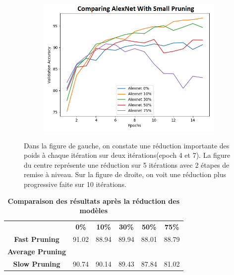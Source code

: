 \documentclass[12pt]{article}
\begin{document}
\begin{figure}[H]
\begin{subfigure}[b]{0.33\textwidth}
		\label{fig:pruneratioslow}
	\end{subfigure}
	\begin{subfigure}[b]{0.33\textwidth}
		\centering
		\includegraphics[width=\textwidth]{prune_ratio_slow}
		\label{fig:pruneratioslow}
	\end{subfigure}
	\caption{Dans la figure de gauche, on constate une réduction importante des poids à chaque itération sur deux itérations(epoch 4 et 7). La figure du centre représente une réduction sur 5 itérations avec 2 étapes de remise à niveau. Sur la figure de droite, on voit une réduction plus progressive faite sur 10 itérations.}
\end{figure}

\begin{table}[H]
	\centering
	\caption {\textbf{Comparaison des résultats après la réduction des modèles}}
	\begin{tabular}{clllll}
		\textbf{}                & \multicolumn{1}{c}{\textbf{0\%}} & \multicolumn{1}{c}{\textbf{10\%}} & \multicolumn{1}{c}{\textbf{30\%}} & \multicolumn{1}{c}{\textbf{50\%}} & \multicolumn{1}{c}{\textbf{75\%}} \\
		\textbf{Fast Pruning}    & 91.02                            & 88.94                             & 89.94                             & 88.01                             & 88.79                             \\
		\textbf{Average Pruning} &                                  &                                   &                                   &                                   &                                   \\
		\textbf{Slow Pruning}    & 90.74                            & 90.14                             & 89.43                             & 87.84                             & 81.02                            
	\end{tabular}
\end{table}
\end{document}
